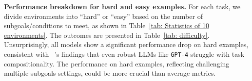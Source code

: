 




     



\textbf{Performance breakdown for hard and easy examples.} For each task, we divide environments into ``hard'' or ``easy'' based on the number of subgoals/conditions to meet, as shown in Table~\ref{tab: Statistics of 10 environments}. The outcomes are presented in Table~\ref{tab: difficulty}.
Unsurprisingly, all models show a significant performance drop on hard examples, consistent with ~\citet{dziri2023faith}'s findings that even robust LLMs like \texttt{GPT-4} struggle with task compositionality. The performance on hard examples, reflecting challenging multiple subgoals settings, could be more crucial than average metrics.

